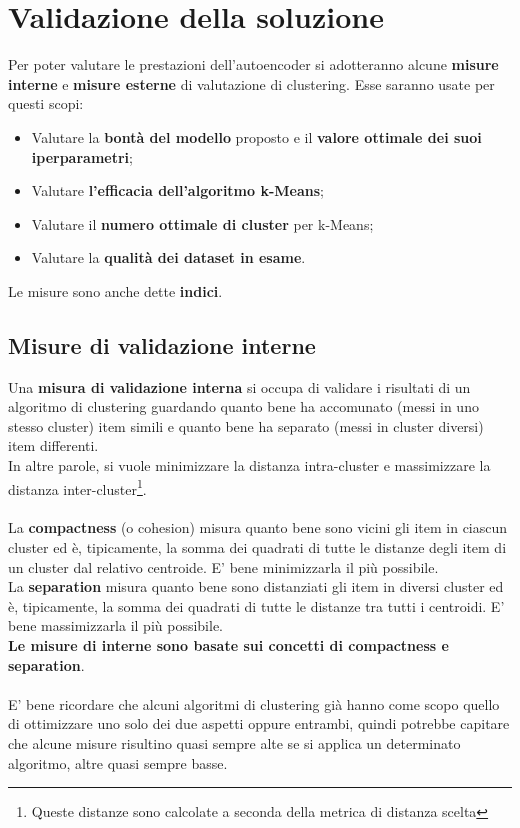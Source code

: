 \section{Validazione della soluzione}
Per poter valutare le prestazioni dell'autoencoder si adotteranno alcune \textbf{misure interne} e \textbf{misure esterne}\cite{metrics} di valutazione di clustering. Esse saranno usate per questi scopi:
\begin{itemize}
	\item Valutare la \textbf{bontà del modello} proposto e il \textbf{valore ottimale dei suoi iperparametri};
	\item Valutare \textbf{l'efficacia dell'algoritmo k-Means};
	\item Valutare il \textbf{numero ottimale di cluster} per k-Means;
	\item Valutare la \textbf{qualità dei dataset in esame}.
\end{itemize}
Le misure sono anche dette \textbf{indici}.

\subsection{Misure di validazione interne}
Una \textbf{misura di validazione interna} si occupa di validare i risultati di un algoritmo di clustering guardando quanto bene ha accomunato (messi in uno stesso cluster) item simili e quanto bene ha separato (messi in cluster diversi) item differenti.\\
In altre parole, si vuole minimizzare la distanza intra-cluster e massimizzare la distanza inter-cluster\footnote{Queste distanze sono calcolate a seconda della metrica di distanza scelta}.\\
\\
La \textbf{compactness} (o cohesion) misura quanto bene sono vicini gli item in ciascun cluster ed è, tipicamente, la somma dei quadrati di tutte le distanze degli item di un cluster dal relativo centroide. E' bene minimizzarla il più possibile.\\
La \textbf{separation} misura quanto bene sono distanziati gli item in diversi cluster ed è, tipicamente, la somma dei quadrati di tutte le distanze tra tutti i centroidi. E' bene massimizzarla il più possibile.\\
\textbf{Le misure di interne sono basate sui concetti di compactness e separation}.\\
\\
E' bene ricordare che alcuni algoritmi di clustering già hanno come scopo quello di ottimizzare uno solo dei due aspetti oppure entrambi, quindi potrebbe capitare che alcune misure risultino quasi sempre alte se si applica un determinato algoritmo, altre quasi sempre basse.

